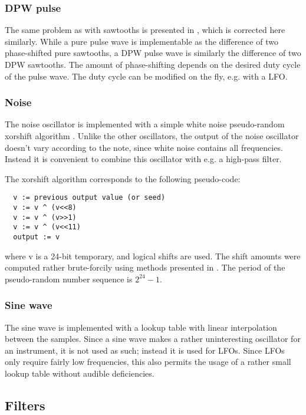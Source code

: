 \documentclass[10pt,a4paper,oneside]{article}
\begin{document}
\subsubsection{DPW pulse}

The same problem as with sawtooths is presented in \cite{algos}, which is corrected here similarly. While a pure pulse wave is implementable as the difference of two phase-shifted pure sawtooths, a DPW pulse wave is similarly the difference of two DPW sawtooths. The amount of phase-shifting depends on the desired duty cycle of the pulse wave. The duty cycle can be modified on the fly, e.g. with a LFO.

\subsubsection{Noise}

The noise oscillator is implemented with a simple white noise pseudo-random xorshift algorithm \cite{marsaglia2003xorshift}. Unlike the other oscillators, the output of the noise oscillator doesn't vary according to the note, since white noise contains all frequencies. Instead it is convenient to combine this oscillator with e.g. a high-pass filter.

The xorshift algorithm corresponds to the following pseudo-code:

\begin{verbatim}
  v := previous output value (or seed)
  v := v ^ (v<<8)
  v := v ^ (v>>1)
  v := v ^ (v<<11)
  output := v
\end{verbatim}

where v is a 24-bit temporary, and logical shifts are used. The shift amounts were computed rather brute-forcily using methods presented in \cite{marsaglia2003xorshift}. The period of the pseudo-random number sequence is $2^{24} - 1$.

\subsubsection{Sine wave}


The sine wave is implemented with a lookup table with linear interpolation between the samples. Since a sine wave makes a rather uninteresting oscillator for an instrument, it is not used as such; instead it is used for LFOs. Since LFOs only require fairly low frequencies, this also permits the usage of a rather small lookup table without audible deficiencies.

\subsection{Filters}
\end{document}
